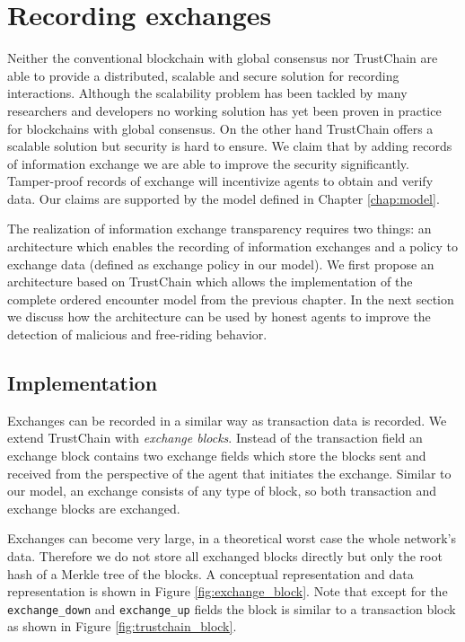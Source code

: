 \chapter{Recording exchanges}
\label{sec:extension}
Neither the conventional blockchain with global consensus nor TrustChain are able to provide a 
distributed, scalable and secure solution for recording interactions. Although the scalability 
problem has been tackled by many researchers and developers\cite{poon2016bitcoin, luu2016secure}
no working solution has yet been proven in practice for blockchains with global consensus. On the 
other hand TrustChain offers a scalable solution but security is hard to ensure. We claim that by 
adding records of information exchange we are able to improve the security significantly. 
Tamper-proof records of exchange will incentivize agents to 
obtain and verify data. Our claims are supported by the model defined in Chapter \ref{chap:model}.

The realization of information exchange transparency requires two things: an architecture which enables the 
recording of information exchanges and a policy to exchange data (defined as exchange policy in 
our model). We first propose an architecture based on TrustChain which allows the implementation 
of the complete ordered encounter model from the previous chapter. In the next section we discuss
how the architecture can be used by honest agents to improve the detection of malicious and free-riding 
behavior.

\section{Implementation}
Exchanges can be recorded in a similar way as transaction data is recorded. We extend TrustChain with \textit{exchange blocks}. Instead of the transaction
field an exchange block contains two exchange fields which store the blocks sent and received from the perspective of
the agent that initiates the exchange. Similar to our model, an exchange consists of any type of block, so both transaction and exchange 
blocks are exchanged. 

Exchanges can become very large, in a theoretical 
worst case the whole network's data. Therefore we do not store all exchanged blocks directly but only
the root hash of a Merkle tree of the blocks. A conceptual representation and data representation 
is shown in Figure \ref{fig:exchange_block}. Note that except for the \verb|exchange_down| and \verb|exchange_up|
fields the block is similar to a transaction block as shown in Figure \ref{fig:trustchain_block}. 


